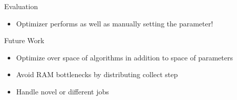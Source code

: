 \documentclass[final]{beamer}
\begin{document}
{\begin{frame}{}
\begin{center}
\begin{columns}[t]
\begin{column}{0.32\textwidth}
\begin{block}{\huge Evaluation}
\begin{itemize}
\item Optimizer performs as well as manually setting the parameter!
\end{itemize}

\vspace{1cm}
    \end{block}

\vspace{1.5cm}

    \begin{block}{\huge Future Work}
\begin{itemize}
\item Optimize over space of algorithms in addition to space of parameters
\item Avoid RAM bottlenecks by distributing collect step
\item Handle novel or different jobs
\end{itemize}
\vspace{.5cm}
    \end{block}

\vspace{1.5cm}


\end{column}
\end{columns}
\end{center}
\end{frame}}
\end{document}
